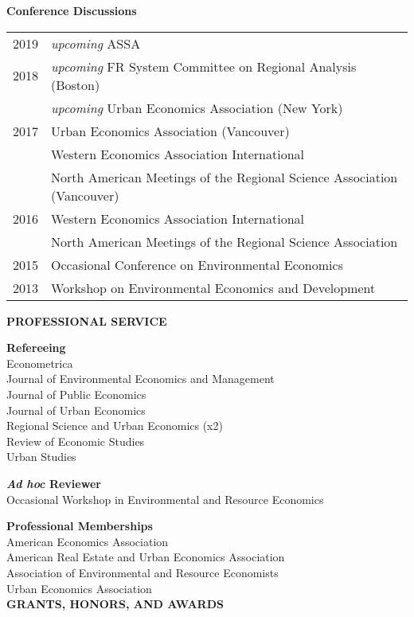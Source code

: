 \documentclass[english, 10pt]{report}
\begin{document}
{\bf Conference Discussions}

\begin{longtable}{@{}p{0.4in}p{6.1in}}
	2019		& \emph{upcoming} ASSA \\
	2018		& \emph{upcoming} FR System Committee on Regional Analysis (Boston) \\
			& \emph{upcoming} Urban Economics Association (New York) \\
	2017 	& Urban Economics Association (Vancouver) \\
			& Western Economics Association International \\
			& North American Meetings of the Regional Science Association (Vancouver)\\
	2016 	& Western Economics Association International \\
			& North American Meetings of the Regional Science Association\\
	2015		& Occasional Conference on Environmental Economics \\
	2013 	& Workshop on Environmental Economics and Development 
\end{longtable}

{\bf {PROFESSIONAL SERVICE}}

{\bf Refereeing} \\[4pt]
Econometrica \\
Journal of Environmental Economics and Management \\
Journal of Public Economics \\
Journal of Urban Economics \\
Regional Science and Urban Economics (x2) \\
Review of Economic Studies \\
Urban Studies 

{\bf \emph{Ad hoc} Reviewer} \\[4pt]
Occasional Workshop in Environmental and Resource Economics  

{\bf Professional Memberships} \\[4pt]
American Economics Association \\
American Real Estate and Urban Economics Association \\
Association of Environmental and Resource Economists \\
Urban Economics Association \\

{\bf {GRANTS, HONORS, AND AWARDS}}
\end{document}
